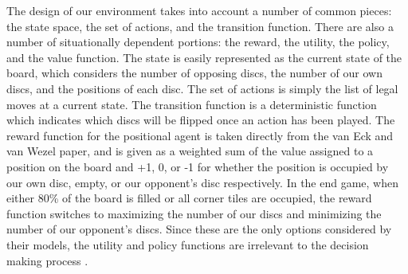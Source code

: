 \documentclass{article}
\begin{document}
The design of our environment takes into account a number of common pieces: the state space, the set of actions, and the transition function. There are also a number of situationally dependent portions: the reward, the utility, the policy, and the value function. The state is easily represented as the current state of the board, which considers the number of opposing discs, the number of our own discs, and the positions of each disc. The set of actions is simply the list of legal moves at a current state. The transition function is a deterministic function which indicates which discs will be flipped once an action has been played. The reward function for the positional agent is taken directly from the van Eck and van Wezel paper, and is given as a weighted sum of the value assigned to a position on the board and +1, 0, or -1 for whether the position is occupied by our own disc, empty, or our opponent’s disc respectively. In the end game, when either 80\% of the board is filled or all corner tiles are occupied, the reward function switches to maximizing the number of our discs and minimizing the number of our opponent’s discs. Since these are the only options considered by their models, the utility and policy functions are irrelevant to the decision making process \cite{vanEck2008}.
\end{document}
